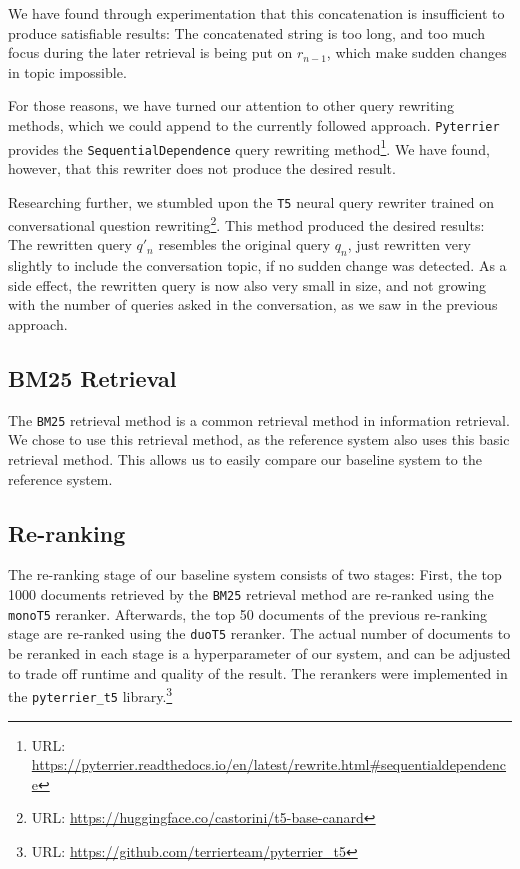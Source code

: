 \documentclass[sigconf]{acmart}
\begin{document}
We have found through experimentation that this concatenation is insufficient to produce satisfiable results: The concatenated string is too long, and too much focus during the later retrieval is being put on $r_{n-1}$, which make sudden changes in topic impossible.

For those reasons, we have turned our attention to other query rewriting methods, which we could append to the currently followed approach. \texttt{Pyterrier} provides the \texttt{SequentialDependence} query rewriting method\footnote{URL: \url{https://pyterrier.readthedocs.io/en/latest/rewrite.html\#sequentialdependence}}. We have found, however, that this rewriter does not produce the desired result.

Researching further, we stumbled upon the \texttt{T5} neural query rewriter trained on conversational question rewriting\footnote{URL: \url{https://huggingface.co/castorini/t5-base-canard}}. This method produced the desired results: The rewritten query $q'_n$ resembles the original query $q_n$, just rewritten very slightly to include the conversation topic, if no sudden change was detected. As a side effect, the rewritten query is now also very small in size, and not growing with the number of queries asked in the conversation, as we saw in the previous approach.

\subsection{BM25 Retrieval}
The \texttt{BM25} retrieval method is a common retrieval method in information retrieval. We chose to use this retrieval method, as the reference system also uses this basic retrieval method. This allows us to easily compare our baseline system to the reference system.

\subsection{Re-ranking}
The re-ranking stage of our baseline system consists of two stages: First, the top 1000 documents retrieved by the \texttt{BM25} retrieval method are re-ranked using the \texttt{monoT5} reranker. Afterwards, the top 50 documents of the previous re-ranking stage are re-ranked using the \texttt{duoT5} reranker. The actual number of documents to be reranked in each stage is a hyperparameter of our system, and can be adjusted to trade off runtime and quality of the result. The rerankers were implemented in the \texttt{pyterrier\_t5} library.\footnote{URL: \url{https://github.com/terrierteam/pyterrier_t5}}
\end{document}
